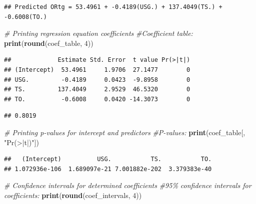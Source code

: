 \documentclass[
]{article}
\newenvironment{Shaded}{\begin{snugshade}}{\end{snugshade}}
\newcommand{\CommentTok}[1]{\textcolor[rgb]{0.56,0.35,0.01}{\textit{#1}}}
\newcommand{\DecValTok}[1]{\textcolor[rgb]{0.00,0.00,0.81}{#1}}
\newcommand{\FunctionTok}[1]{\textcolor[rgb]{0.13,0.29,0.53}{\textbf{#1}}}
\newcommand{\NormalTok}[1]{#1}
\newcommand{\SpecialCharTok}[1]{\textcolor[rgb]{0.81,0.36,0.00}{\textbf{#1}}}
\newcommand{\StringTok}[1]{\textcolor[rgb]{0.31,0.60,0.02}{#1}}
\begin{document}
\begin{verbatim}
## Predicted ORtg = 53.4961 + -0.4189(USG.) + 137.4049(TS.) + -0.6008(TO.)
\end{verbatim}

\begin{Shaded}
\begin{Highlighting}[]
\CommentTok{\# Printing regression equation coefficients}
\CommentTok{\#Coefficient table:}
\FunctionTok{print}\NormalTok{(}\FunctionTok{round}\NormalTok{(coef\_table, }\DecValTok{4}\NormalTok{))}
\end{Highlighting}
\end{Shaded}

\begin{verbatim}
##             Estimate Std. Error  t value Pr(>|t|)
## (Intercept)  53.4961     1.9706  27.1477        0
## USG.         -0.4189     0.0423  -9.8958        0
## TS.         137.4049     2.9529  46.5320        0
## TO.          -0.6008     0.0420 -14.3073        0
\end{verbatim}

\begin{Shaded}
\end{Shaded}

\begin{verbatim}
## 0.8019
\end{verbatim}

\begin{Shaded}
\begin{Highlighting}[]
\CommentTok{\# Printing p{-}values for intercept and predictors}
\CommentTok{\#P{-}values:}
\FunctionTok{print}\NormalTok{(coef\_table[, }\StringTok{"Pr(\textgreater{}|t|)"}\NormalTok{])}
\end{Highlighting}
\end{Shaded}

\begin{verbatim}
##   (Intercept)          USG.           TS.           TO. 
## 1.072936e-106  1.689097e-21 7.001882e-202  3.379383e-40
\end{verbatim}

\begin{Shaded}
\begin{Highlighting}[]
\CommentTok{\# Confidence intervals for determined coefficients}
\CommentTok{\#95\% confidence intervals for coefficients:}
\FunctionTok{print}\NormalTok{(}\FunctionTok{round}\NormalTok{(coef\_intervals, }\DecValTok{4}\NormalTok{))}
\end{Highlighting}
\end{Shaded}
\end{document}
